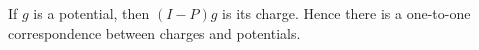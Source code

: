If $g$ is a potential, then $(I - P)g$ is its charge. Hence there is a one-to-one correspondence between charges and potentials.
